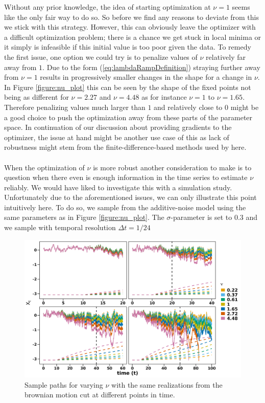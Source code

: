 Without any prior knowledge, the idea of starting optimization at $\nu = 1$ seems like the only fair way to do so. So before we find any reasons to deviate from this we stick with this strategy. However, this can obviously leave the optimizer with a difficult optimization problem; there is a chance we get stuck in local minima or it simply is infeasible if this initial value is too poor given the data. To remedy the first issue, one option we could try is to penalize values of $\nu$ relatively far away from $1$. Due to the form (\ref{eq:lambdaRampDefinition}) straying further away from $\nu = 1$ results in progressively smaller changes in the shape for a change in $\nu$. In Figure \ref{figure:nu_plot} this can be seen by the shape of the fixed points not being as different for $\nu = 2.27$ and $\nu = 4.48$ as for instance $\nu = 1$ to $\nu = 1.65$. Therefore penalizing values much larger than $1$ and relatively close to $0$ might be a good choice to push the optimization away from these parts of the parameter space. In continuation of our discussion about providing gradients to the optimizer, the issue at hand might be another use case of this as lack of robustness might stem from the finite-difference-based methods used by  here. \\\\
When the optimization of $\nu$ is more robust another consideration to make is to question when there even is enough information in the time series to estimate $\nu$ reliably. We would have liked to investigate this with a simulation study. Unfortunately due to the aforementioned issues, we can only illustrate this point intuitively here. To do so, we sample from the additive-noise model using the same parameters as in Figure \ref{figure:nu_plot}. The $\sigma$-parameter is set to $0.3$ and we sample with temporal resolution $\Delta t = 1/24$
\begin{figure}[h!]
    \begin{center}
    \includegraphics[scale = .13]{figures/mu_simulations_discussion_plot.jpeg}
    \caption{Sample paths for varying $\nu$ with the same realizations from the brownian motion cut at different points in time.}
    \label{figure:mu_simulations_discussion_plot}
    \end{center}
\end{figure}\\

